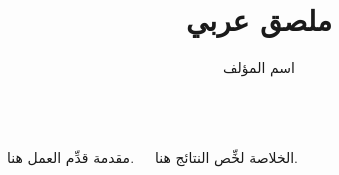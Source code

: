 \documentclass{beamer}
\title{ملصق عربي}
\author{اسم المؤلف}
\begin{document}
\begin{frame}
\begin{columns}[t]
  \begin{block}{مقدمة}
    قدِّم العمل هنا.
  \end{block}
  \begin{block}{الخلاصة}
    لخِّص النتائج هنا.
  \end{block}
\end{columns}
\end{frame}
\end{document}
